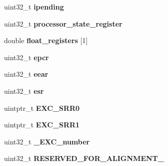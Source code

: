 \begin{DoxyCompactItemize}
\mbox{\label{structCPU__Exception__frame_ae6deb183249283e899bb85fc4e063694}} 
uint32\+\_\+t {\bfseries ipending}
\item 
\mbox{\label{structCPU__Exception__frame_acb52f60ab9b3522a2ec47f78c0b1a250}} 
uint32\+\_\+t {\bfseries processor\+\_\+state\+\_\+register}
\item 
\mbox{\label{structCPU__Exception__frame_a734ea9d62b1b6b421bcb59e55d8bc30c}} 
double {\bfseries float\+\_\+registers} \mbox{[}1\mbox{]}
\item 
\mbox{\label{structCPU__Exception__frame_ab04eedd7e9769cb8d989d3274fdd72eb}} 
uint32\+\_\+t {\bfseries epcr}
\item 
\mbox{\label{structCPU__Exception__frame_ac5812bcb7789c64bf0dd42bba56d6cea}} 
uint32\+\_\+t {\bfseries eear}
\item 
\mbox{\label{structCPU__Exception__frame_ada38dbb79a56c26fcfc42b39fd9393fa}} 
uint32\+\_\+t {\bfseries esr}
\item 
\mbox{\label{structCPU__Exception__frame_a9d8487bf6e9f6dbcb8798ef4c1eac1e9}} 
uintptr\+\_\+t {\bfseries E\+X\+C\+\_\+\+S\+R\+R0}
\item 
\mbox{\label{structCPU__Exception__frame_a7484a554ea2df19686ee61676fbb0ad8}} 
uintptr\+\_\+t {\bfseries E\+X\+C\+\_\+\+S\+R\+R1}
\item 
\mbox{\label{structCPU__Exception__frame_a9a501eb973bd8ca15e72358ca3bf3c8c}} 
uint32\+\_\+t {\bfseries \+\_\+\+E\+X\+C\+\_\+number}
\item 
\mbox{\label{structCPU__Exception__frame_a0e8892d707374982fc89d127b8680a0a}} 
uint32\+\_\+t {\bfseries R\+E\+S\+E\+R\+V\+E\+D\+\_\+\+F\+O\+R\+\_\+\+A\+L\+I\+G\+N\+M\+E\+N\+T\+\_}
\item 
\mbox{\label{structCPU__Exception__frame_ac645304eb1dfda31bc758c332ffeec4d}} 

\end{DoxyCompactItemize}
